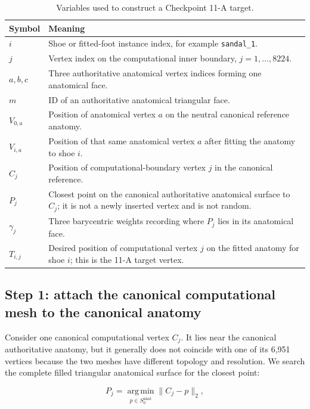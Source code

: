\documentclass[11pt]{article}
\begin{document}
\begin{table}[H]
\centering
\small
\begin{tabularx}{\textwidth}{@{}p{}X@{}}
\toprule
\textbf{Symbol} & \textbf{Meaning}\\
\midrule
$i$ & Shoe or fitted-foot instance index, for example \texttt{sandal\_1}.\\
$j$ & Vertex index on the computational inner boundary, $j=1,\ldots,8224$.\\
$a,b,c$ & Three authoritative anatomical vertex indices forming one anatomical face.\\
$m$ & ID of an authoritative anatomical triangular face.\\
$V_{0,a}$ & Position of anatomical vertex $a$ on the neutral canonical reference anatomy.\\
$V_{i,a}$ & Position of that same anatomical vertex $a$ after fitting the anatomy to shoe $i$.\\
$C_j$ & Position of computational-boundary vertex $j$ in the canonical reference.\\
$P_j$ & Closest point on the canonical authoritative anatomical surface to $C_j$; it is
not a newly inserted vertex and is not random.\\
$\gamma_j$ & Three barycentric weights recording where $P_j$ lies in its anatomical face.\\
$T_{i,j}$ & Desired position of computational vertex $j$ on the fitted anatomy for shoe $i$;
this is the 11-A target vertex.\\
\bottomrule
\end{tabularx}
\caption{Variables used to construct a Checkpoint 11-A target.}
\label{tab:11a-notation}
\end{table}

\subsection{Step 1: attach the canonical computational mesh to the canonical anatomy}

Consider one canonical computational vertex $C_j$. It lies near the canonical
authoritative anatomy, but it generally does not coincide with one of its 6,951 vertices
because the two meshes have different topology and resolution. We search the complete
filled triangular anatomical surface for the closest point:

\begin{equation}
  P_j=\operatorname*{arg\,min}_{p\in S_0^{\mathrm{anat}}}
      \|C_j-p\|_2,
  \label{eq:11a-closest-point}
\end{equation}
\end{document}
